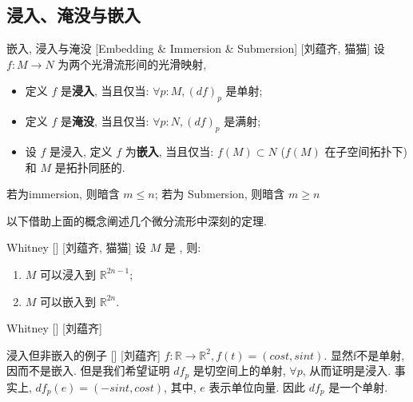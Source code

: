 \documentclass[UTF8]{ctexart}
\begin{document}
    \subsection{浸入、淹没与嵌入}
    
        \begin{dfn}
            []
            {嵌入, 浸入与淹没}
            [Embedding \& Immersion \& Submersion]
            [刘蕴齐, 猫猫]
            设 \(f: M \to N\) 为两个光滑流形间的光滑映射, 
            \begin{itemize}
                \item 定义 \(f\) 是\textbf{浸入}, 当且仅当: \(\forall p:M, {(df)}_p\) 是单射; 
                \item 定义 \(f\) 是\textbf{淹没}, 当且仅当: \(\forall p:N, {(df)}_p\) 是满射; 
                \item 设 \(f\) 是浸入, 定义 \(f\) 为\textbf{嵌入}, 当且仅当: \(f(M)\subset N\)  (\(f(M)\) 在子空间拓扑下) 和 \(M\) 是拓扑同胚的. 
            \end{itemize}
        \end{dfn}

        \begin{rmk}
            []
            若为immersion, 则暗含 \(m \leq n\); 若为 Submersion, 则暗含 \(m \geq n\) 
        \end{rmk}

        以下借助上面的概念阐述几个微分流形中深刻的定理. 

        \begin{thm}
            []
            {Whitney}
            []
            [刘蕴齐, 猫猫]
            设 \(M\) 是 , 则: 
            \begin{enumerate}
                \item \(M\) 可以浸入到 \(\mathbb{R}^{2n-1}\); 
    
                \item \(M\) 可以嵌入到 \(\mathbb{R}^{2n}\). 
            \end{enumerate}
        \end{thm}

        \begin{thm}
            []
            {Whitney}
            []
            [刘蕴齐]
        \end{thm}

        \begin{xmp}
            []
            {浸入但非嵌入的例子}
            []
            [刘蕴齐]
             \(f: \mathbb{R} \to \mathbb{R}^2, f(t) = (cost, sint)\). 
            显然f不是单射, 因而不是嵌入. 
            但是我们希望证明  \(df_p\)  是切空间上的单射,  \(\forall p\), 从而证明是浸入. 
            事实上,  \(df_p(e) = (-sint, cost)\), 其中,  \(e\) 表示单位向量. 因此 \(df_p\) 是一个单射. 
        \end{xmp}
\end{document}
